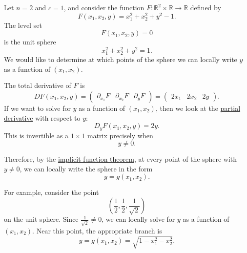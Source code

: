	\begin{example}
	  \label{ex:sphere-example}
		Let $n=2$ and $c=1$, and consider the function
		$F:\mathbb{R}^2 \times \mathbb{R} \to \mathbb{R}$ defined by
		\begin{equation}
			F(x_1,x_2,y) = x_1^2 + x_2^2 + y^2 - 1.
		\end{equation}
		The level set
		\begin{equation}
			F(x_1,x_2,y)=0
		\end{equation}
		is the unit sphere
		\begin{equation}
			x_1^2+x_2^2+y^2=1.
		\end{equation}
		We would like to determine at which points of the sphere we can locally
		write $y$ as a function of $(x_1,x_2)$.

		The total derivative of $F$ is
		\begin{equation}
			DF(x_1,x_2,y)
			=
			\begin{pmatrix}
				\partial_{x_1}F & \partial_{x_2}F & \partial_y F
			\end{pmatrix}
			=
			\begin{pmatrix}
				2x_1 & 2x_2 & 2y
			\end{pmatrix}.
		\end{equation}
		If we want to solve for $y$ as a function of $(x_1,x_2)$, then we look at
		the \hyperref[def:partial-derivative]{partial derivative} with respect to $y$:
		\begin{equation}
			D_yF(x_1,x_2,y) = 2y.
		\end{equation}
		This is invertible as a $1 \times 1$ matrix precisely when
		\begin{equation}
			y \neq 0.
		\end{equation}

		Therefore, by the \hyperref[thm:implicit-function-theorem]{implicit function theorem}, at every point of the sphere
		with $y \neq 0$, we can locally write the sphere in the form
		\begin{equation}
			y = g(x_1,x_2).
		\end{equation}

		For example, consider the point
		\begin{equation}
			\left(\frac{1}{2},\frac{1}{2},\frac{1}{\sqrt{2}}\right)
		\end{equation}
		on the unit sphere. Since $\frac{1}{\sqrt{2}}\neq 0$, we can locally solve
		for $y$ as a function of $(x_1,x_2)$. Near this point, the appropriate
		branch is
		\begin{equation}
			y = g(x_1,x_2) = \sqrt{1-x_1^2-x_2^2}.
		\end{equation}


\end{example}
